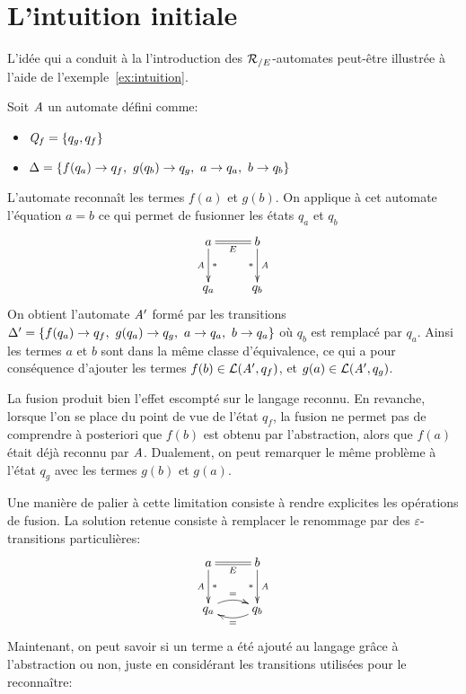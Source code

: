 



\section{L'intuition initiale}
\label{sec:intuition}
L'idée qui a conduit à la l'introduction des ${\mathcal R_{/E}}$-automates peut-être illustrée à l'aide de l'exemple~\ref{ex:intuition}.
\begin{example}
  \label{ex:intuition}
  Soit $\mathit A$ un automate défini comme:
  \begin{itemize}
  \item $\mathit Q_f = \{ q_g, q_f\}$
  \item $\Delta = \{ f(q_a) \rightarrow q_f,\ g(q_b) \rightarrow q_g,\ a\rightarrow q_a,\ b\rightarrow q_b\}$
  \end{itemize}
  L'automate reconnaît les termes $f(a)$ et $g(b)$.
  On applique à cet automate l'équation $a = b$ ce qui permet de fusionner les états $q_a$ et $q_b$
  \[\xymatrix{
    a \ar@{=}_{E}[r]\ar[d]_{\A}^{*} & b \ar[d]_{*}^{\A}\\
    q_a & q_b
  }
  \]
  On obtient l'automate $\mathit A'$ formé par les transitions $\Delta' = \{ f(q_a) \rightarrow q_f,\ g(q_a) \rightarrow q_g,\ a\rightarrow q_a,\ b\rightarrow q_a\}$
  où $q_b$ est remplacé par $q_a$. Ainsi les termes $a$ et $b$ sont dans la même classe d'équivalence, ce qui a pour 
  conséquence d'ajouter les termes $f(b) \in \mathcal{L}(\mathit A', q_f)$, et $g(a) \in \mathcal{L}(\mathit A', q_g)$.
\end{example}

  La fusion produit bien l'effet escompté sur le langage reconnu. En revanche, lorsque l'on se place du point de vue
  de l'état $q_f$, la fusion ne permet pas de comprendre à posteriori que  $f(b)$ est obtenu par l'abstraction, 
  alors que $f(a)$ était déjà reconnu par $\mathit A$. Dualement, on peut remarquer le même problème à l'état $q_g$ avec les termes
  $g(b)$ et $g(a)$.

  Une manière de palier à cette limitation consiste à rendre explicites les opérations de fusion.
  La solution retenue consiste à remplacer le renommage par des $\varepsilon$-transitions particulières:
  \[\xymatrix{
    a \ar@{=}_{E}[r]\ar[d]_{\A}^{*} & b \ar[d]_{*}^{\A}\\
    q_a \ar@/^0.6pc/[r]^{=} & q_b \ar@/^0.6pc/[l]^{=}
  }
  \]
  Maintenant, on peut savoir si un terme a été ajouté au langage grâce à l'abstraction ou non, juste en considérant
  les transitions utilisées pour le reconnaître:

